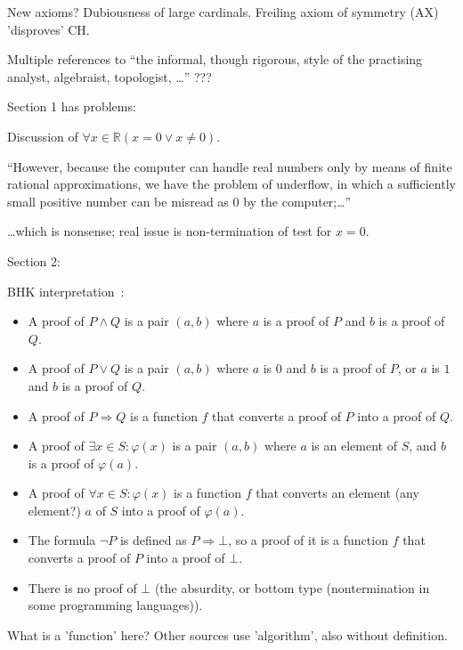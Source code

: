 \textsf{New axioms?}
\hfill\break
Dubiousness of large cardinals.
\hfill\break
Freiling axiom of 
symmetry (AX)~\cite{freiling1986,wiki:Freilings_axiom_of_symmetry}
'disproves' CH.

\label{sec:Constructivism_SEP}
\cite{sep:mathematics_constructive}

Multiple references to ``the informal, though rigorous, 
style of the practising analyst, algebraist, topologist, \ldots''
???

Section 1 has problems:

Discussion of
$ \forall x \in \mathbb{R} (x = 0 \vee x \ne 0)$.

``However, because the computer can handle real numbers 
only by means of finite rational approximations, 
we have the problem of underflow, 
in which a sufficiently small positive number can be misread as 0 
by the computer;\ldots''

\ldots which is nonsense;
real issue is non-termination of test for $x=0$.

Section 2:

BHK interpretation~\cite{wiki:Brouwer_Heyting_Kolmogorov_interpretation}:
\begin{itemize}
  \item A proof of $P\wedge Q$ 
  is a pair $(a,b)$ where $a$ is a proof of $P$ 
  and $b$ is a proof of $Q$.
\item A proof of $P\vee Q$ is a pair $(a,b)$ 
where $a$ is $0$ and 
$b$ is a proof of $P$, 
or $a$ is $1$ 
and $b$ is a proof of $Q$.
\item A proof of $P\Rightarrow Q$ is 
a function $f$ that converts 
a proof of $P$ into a proof of $Q$.
\item A proof of $\exists x\in S:\varphi (x)$ is 
a pair $(a,b)$ where 
$a$ is an element of $S$, 
and $b$ is a proof of $\varphi (a)$.
\item A proof of $\forall x\in S:\varphi (x)$ is 
a function $f$ that converts 
an element (any element?) $a$ of $S$ into a proof of $\varphi (a)$.
\item The formula $\neg P$ is defined as $P\Rightarrow \bot$, 
so a proof of it is a function $f$ that converts 
a proof of $P$ into a proof of $\bot$.
\item There is no proof of $\bot$
(the absurdity, or bottom type 
(nontermination in some programming languages)).
\end{itemize}
What is a 'function' here? 
Other sources use 'algorithm', also without definition.

